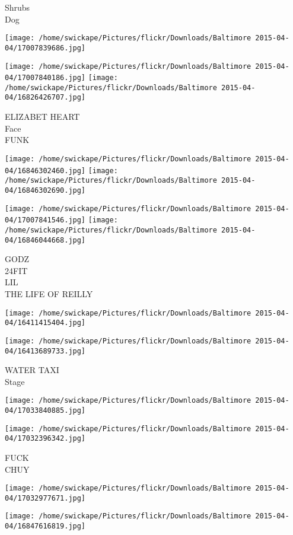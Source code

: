 \documentclass[10pt,letterpaper]{article}
\begin{document}
Shrubs\\
Dog
\pagebreak

\texttt{[image: /home/swickape/Pictures/flickr/Downloads/Baltimore 2015-04-04/17007839686.jpg]}

\vspace{0.25in}
\texttt{[image: /home/swickape/Pictures/flickr/Downloads/Baltimore 2015-04-04/17007840186.jpg]}
\texttt{[image: /home/swickape/Pictures/flickr/Downloads/Baltimore 2015-04-04/16826426707.jpg]}

ELIZABET HEART\\
Face\\
FUNK
\pagebreak

\texttt{[image: /home/swickape/Pictures/flickr/Downloads/Baltimore 2015-04-04/16846302460.jpg]}
\texttt{[image: /home/swickape/Pictures/flickr/Downloads/Baltimore 2015-04-04/16846302690.jpg]}

\texttt{[image: /home/swickape/Pictures/flickr/Downloads/Baltimore 2015-04-04/17007841546.jpg]}
\texttt{[image: /home/swickape/Pictures/flickr/Downloads/Baltimore 2015-04-04/16846044668.jpg]}

GODZ\\
24FIT\\
LIL\\
THE LIFE OF REILLY
\pagebreak

\texttt{[image: /home/swickape/Pictures/flickr/Downloads/Baltimore 2015-04-04/16411415404.jpg]}

\vspace{0.25in}
\texttt{[image: /home/swickape/Pictures/flickr/Downloads/Baltimore 2015-04-04/16413689733.jpg]}

WATER TAXI\\
Stage
\pagebreak

\texttt{[image: /home/swickape/Pictures/flickr/Downloads/Baltimore 2015-04-04/17033840885.jpg]}

\vspace{0.25in}
\texttt{[image: /home/swickape/Pictures/flickr/Downloads/Baltimore 2015-04-04/17032396342.jpg]}

FUCK\\
CHUY
\pagebreak

\texttt{[image: /home/swickape/Pictures/flickr/Downloads/Baltimore 2015-04-04/17032977671.jpg]}

\vspace{0.25in}
\texttt{[image: /home/swickape/Pictures/flickr/Downloads/Baltimore 2015-04-04/16847616819.jpg]}
\end{document}
